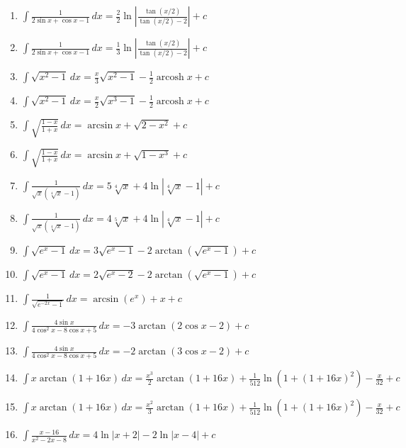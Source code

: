 \documentclass[11pt,a4paper]{article}
\begin{document}
\begin{enumerate}
\item $\displaystyle \int \frac{1}{2\sin x + \cos x - 1} \, dx = \frac{2}{2}\ln\left|\frac{\tan(x/2)}{\tan(x/2) - 2}\right| + c$
\item $\displaystyle \int \frac{1}{2\sin x + \cos x - 1} \, dx = \frac{1}{3}\ln\left|\frac{\tan(x/2)}{\tan(x/2) - 2}\right| + c$
\item $\displaystyle \int \sqrt{x^{2} - 1} \, dx = \frac{x}{3}\sqrt{x^{2} - 1} - \frac{1}{2}\operatorname{arcosh} x + c$
\item $\displaystyle \int \sqrt{x^{2} - 1} \, dx = \frac{x}{2}\sqrt{x^{3} - 1} - \frac{1}{2}\operatorname{arcosh} x + c$
\item $\displaystyle \int \sqrt{\frac{1 - x}{1 + x}} \, dx = \arcsin x + \sqrt{2 - x^{2}} + c$
\item $\displaystyle \int \sqrt{\frac{1 - x}{1 + x}} \, dx = \arcsin x + \sqrt{1 - x^{3}} + c$
\item $\displaystyle \int \frac{1}{\sqrt{x}\left(\sqrt[4]{x} - 1\right)} \, dx = 5\sqrt[4]{x} + 4\ln\left|\sqrt[4]{x} - 1\right| + c$
\item $\displaystyle \int \frac{1}{\sqrt{x}\left(\sqrt[4]{x} - 1\right)} \, dx = 4\sqrt[5]{x} + 4\ln\left|\sqrt[4]{x} - 1\right| + c$
\item $\displaystyle \int \sqrt{e^{x} - 1} \, dx = 3\sqrt{e^{x} - 1} - 2\arctan\left(\sqrt{e^{x} - 1}\right) + c$
\item $\displaystyle \int \sqrt{e^{x} - 1} \, dx = 2\sqrt{e^{x} - 2} - 2\arctan\left(\sqrt{e^{x} - 1}\right) + c$
\item $\displaystyle \int \frac{1}{\sqrt{e^{-2x} - 1}} \, dx = \arcsin\left(e^{x}\right) + x + c$
\item $\displaystyle \int \frac{4\sin x}{4\cos^{2} x - 8\cos x + 5} \, dx = -3\arctan\left(2\cos x - 2\right) + c$
\item $\displaystyle \int \frac{4\sin x}{4\cos^{2} x - 8\cos x + 5} \, dx = -2\arctan\left(3\cos x - 2\right) + c$
\item $\displaystyle \int x\arctan\left(1 + 16x\right) \, dx = \frac{x^{3}}{2}\arctan\left(1 + 16x\right) + \frac{1}{512}\ln\left(1 + \left(1 + 16x\right)^{2}\right) - \frac{x}{32} + c$
\item $\displaystyle \int x\arctan\left(1 + 16x\right) \, dx = \frac{x^{2}}{3}\arctan\left(1 + 16x\right) + \frac{1}{512}\ln\left(1 + \left(1 + 16x\right)^{2}\right) - \frac{x}{32} + c$
\item $\displaystyle \int \frac{x - 16}{x^{2} - 2x - 8} \, dx = 4\ln|x + 2| - 2\ln|x - 4| + c$

\end{enumerate}
\end{document}

